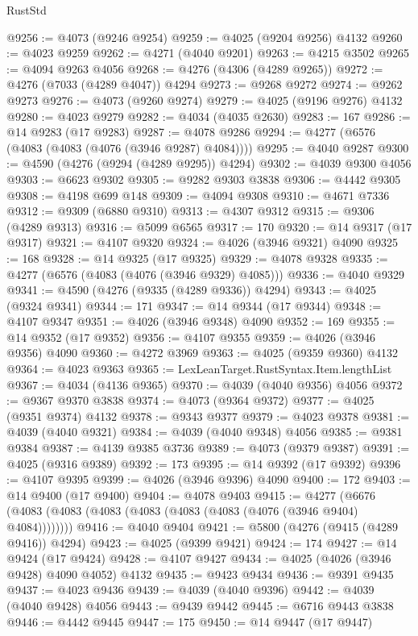 \begin{lexlean}{RustStd}
\begin{coremodule}
@9256 := @4073 (@9246 @9254)
@9259 := @4025 (@9204 @9256) @4132
@9260 := @4023 @9259
@9262 := @4271 (@4040 @9201)
@9263 := @4215 @3502
@9265 := @4094 @9263 @4056
@9268 := @4276 (@4306 (@4289 @9265))
@9272 := @4276 (@7033 (@4289 @4047)) @4294
@9273 := @9268 @9272
@9274 := @9262 @9273
@9276 := @4073 (@9260 @9274)
@9279 := @4025 (@9196 @9276) @4132
@9280 := @4023 @9279
@9282 := @4034 (@4035 @2630)
@9283 := 167
@9286 := @14 @9283 (@17 @9283)
@9287 := @4078 @9286
@9294 := @4277 (@6576 (@4083 (@4083 (@4076 (@3946 @9287) @4084))))
@9295 := @4040 @9287
@9300 := @4590 (@4276 (@9294 (@4289 @9295)) @4294)
@9302 := @4039 @9300 @4056
@9303 := @6623 @9302
@9305 := @9282 @9303 @3838
@9306 := @4442 @9305
@9308 := @4198 @699 @148
@9309 := @4094 @9308
@9310 := @4671 @7336
@9312 := @9309 (@6880 @9310)
@9313 := @4307 @9312
@9315 := @9306 (@4289 @9313)
@9316 := @5099 @6565
@9317 := 170
@9320 := @14 @9317 (@17 @9317)
@9321 := @4107 @9320
@9324 := @4026 (@3946 @9321) @4090
@9325 := 168
@9328 := @14 @9325 (@17 @9325)
@9329 := @4078 @9328
@9335 := @4277 (@6576 (@4083 (@4076 (@3946 @9329) @4085)))
@9336 := @4040 @9329
@9341 := @4590 (@4276 (@9335 (@4289 @9336)) @4294)
@9343 := @4025 (@9324 @9341)
@9344 := 171
@9347 := @14 @9344 (@17 @9344)
@9348 := @4107 @9347
@9351 := @4026 (@3946 @9348) @4090
@9352 := 169
@9355 := @14 @9352 (@17 @9352)
@9356 := @4107 @9355
@9359 := @4026 (@3946 @9356) @4090
@9360 := @4272 @3969
@9363 := @4025 (@9359 @9360) @4132
@9364 := @4023 @9363
@9365 := LexLeanTarget.RustSyntax.Item.lengthList
@9367 := @4034 (@4136 @9365)
@9370 := @4039 (@4040 @9356) @4056
@9372 := @9367 @9370 @3838
@9374 := @4073 (@9364 @9372)
@9377 := @4025 (@9351 @9374) @4132
@9378 := @9343 @9377
@9379 := @4023 @9378
@9381 := @4039 (@4040 @9321)
@9384 := @4039 (@4040 @9348) @4056
@9385 := @9381 @9384
@9387 := @4139 @9385 @3736
@9389 := @4073 (@9379 @9387)
@9391 := @4025 (@9316 @9389)
@9392 := 173
@9395 := @14 @9392 (@17 @9392)
@9396 := @4107 @9395
@9399 := @4026 (@3946 @9396) @4090
@9400 := 172
@9403 := @14 @9400 (@17 @9400)
@9404 := @4078 @9403
@9415 := @4277 (@6676 (@4083 (@4083 (@4083 (@4083 (@4083 (@4083 (@4076 (@3946 @9404) @4084))))))))
@9416 := @4040 @9404
@9421 := @5800 (@4276 (@9415 (@4289 @9416)) @4294)
@9423 := @4025 (@9399 @9421)
@9424 := 174
@9427 := @14 @9424 (@17 @9424)
@9428 := @4107 @9427
@9434 := @4025 (@4026 (@3946 @9428) @4090 @4052) @4132
@9435 := @9423 @9434
@9436 := @9391 @9435
@9437 := @4023 @9436
@9439 := @4039 (@4040 @9396)
@9442 := @4039 (@4040 @9428) @4056
@9443 := @9439 @9442
@9445 := @6716 @9443 @3838
@9446 := @4442 @9445
@9447 := 175
@9450 := @14 @9447 (@17 @9447)

\end{coremodule}
\end{lexlean}
